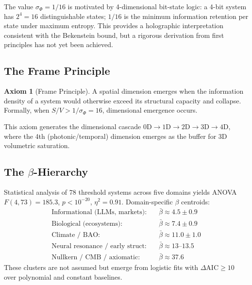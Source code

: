 \documentclass[12pt,a4paper]{article}
\theoremstyle{definition}
\newtheorem{axiom}{Axiom}
\newcommand{\sigphi}{\sigma_{\Phi}}
\begin{document}
\begin{hypothesis}
The value $\sigphi = 1/16$ is motivated by 4-dimensional bit-state logic:
a 4-bit system has $2^4=16$ distinguishable states; $1/16$ is the minimum
information retention per state under maximum entropy.
This provides a holographic interpretation consistent with the Bekenstein bound,
but a rigorous derivation from first principles has not yet been achieved.
\end{hypothesis}

\subsection{The Frame Principle}

\begin{axiom}[Frame Principle]
A spatial dimension emerges when the information density of a system would
otherwise exceed its structural capacity and collapse.
Formally, when $S/V > 1/\sigphi = 16$, dimensional emergence occurs.
\end{axiom}

This axiom generates the dimensional cascade
$0\mathrm{D} \to 1\mathrm{D} \to 2\mathrm{D} \to 3\mathrm{D} \to 4\mathrm{D}$,
where the 4th (photonic/temporal) dimension emerges as the buffer for 3D
volumetric saturation.

\subsection{The $\beta$-Hierarchy}

\begin{validated}
Statistical analysis of 78 threshold systems across five domains yields
ANOVA $F(4,73) = 185.3$, $p < 10^{-20}$, $\eta^2 = 0.91$.
Domain-specific $\beta$ centroids:
\begin{align*}
  \text{Informational (LLMs, markets):} &\quad \bar\beta \approx 4.5\pm0.9 \\
  \text{Biological (ecosystems):}        &\quad \bar\beta \approx 7.4\pm0.9 \\
  \text{Climate / BAO:}                  &\quad \bar\beta \approx 11.0\pm1.0 \\
  \text{Neural resonance / early struct:}&\quad \bar\beta \approx 13\text{--}13.5 \\
  \text{Nullkern / CMB / axiomatic:}     &\quad \bar\beta \approx 37.6
\end{align*}
These clusters are not assumed but emerge from logistic fits with
$\Delta\mathrm{AIC} \geq 10$ over polynomial and constant baselines.
\end{validated}
\end{document}
